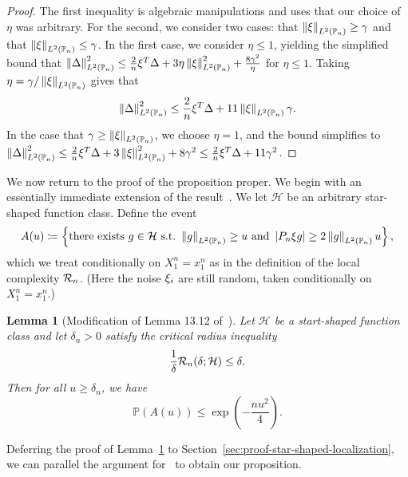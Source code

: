 \documentclass[11pt]{article}
\newcommand{\Prb}{\mathbb{P}}
\renewcommand{\P}{\mathbb{P}}
\newcommand{\mc}[1]{\mathcal{#1}}
\newcommand{\norm}[1]{\left\|{#1}\right\|} %
\newcommand{\<}{\langle} %
\renewcommand{\>}{\rangle}
\newcommand{\defeq}{\coloneqq}
\newcommand{\LtwoPn}[1]{\norm{#1}_{L^2(\Prb_n)}}
\newtheorem{lemma}[claim]{Lemma}
\begin{document}
\begin{proof}
  The first inequality is algebraic manipulations and
  uses that our choice of $\eta$ was arbitrary.
  For the second, we consider two cases:
  that $\LtwoPn{\noise} \ge \gamma$ and that $\LtwoPn{\noise} \le \gamma$.
  In the first case, we consider $\eta \le 1$,
  yielding the simplified bound
  that
  $\LtwoPn{\Delta}^2 \le \frac{2}{n} \noise^T \Delta
  + 3 \eta \LtwoPn{\noise}^2 + \frac{8 \gamma^2}{\eta}$ for
  $\eta \le 1$. Taking $\eta = \gamma / \LtwoPn{\noise}$ gives
  that
  \begin{equation*}
    \LtwoPn{\Delta}^2
    \le \frac{2}{n} \noise^T \Delta
    + 11 \LtwoPn{\noise} \gamma.
  \end{equation*}
  In the case that $\gamma \ge \LtwoPn{\noise}$, we choose $\eta = 1$,
  and the bound simplifies to
  $\LtwoPn{\Delta}^2 \le \frac{2}{n} \noise^T \Delta
  + 3 \LtwoPn{\noise}^2 + 8 \gamma^2
  \le \frac{2}{n} \noise^T \Delta + 11 \gamma^2$.
\end{proof}

We now return to the proof of the proposition proper.
We begin with an essentially immediate extension of the result~\cite[Lemma
  13.12]{Wainwright19}.  We let $\mc{H}$ be an arbitrary star-shaped
function class.
Define the event
\begin{equation}
  \label{eqn:A-wainwright-event}
  A(u) \defeq \left\{
  \mbox{there~exists~} g \in \mc{H} ~ \mbox{s.t.}~
  \LtwoPn{g} \ge u ~ \mbox{and} ~
  \left|P_n \noise g\right| \ge 2 \LtwoPn{g} u
  \right\},
\end{equation}
which we treat conditionally on $X_1^n = x_1^n$ as in the definition
of the local complexity $\localcomplexity_n$.
(Here the noise $\xi_i$ are still random, taken conditionally
on $X_1^n = x_1^n$.)

\begin{lemma}[Modification of Lemma 13.12 of~\citet{Wainwright19}]
  \label{lemma:star-shaped-localization}
  Let $\mc{H}$ be a start-shaped function class
  and let $\delta_n > 0$ satisfy the critical radius inequality
  \begin{equation*}
    \frac{1}{\delta} \localcomplexity_n(\delta; \mc{H}) \le
    \delta.
  \end{equation*}
  Then for all $u \ge \delta_n$, we have
  \begin{equation*}
    \P(A(u)) \le \exp\left(-\frac{n u^2}{4} \right).
  \end{equation*}
\end{lemma}
\noindent
Deferring the proof of Lemma~\ref{lemma:star-shaped-localization}
to Section~\ref{sec:proof-star-shaped-localization},
we can parallel the argument for~\cite[Thm.~13.5]{Wainwright19}
to obtain our proposition.
\end{document}
